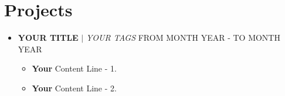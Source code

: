 \documentclass[letterpaper,5pt]{article}
\begin{document}
        
    
    \section{Projects}
    
        \begin{itemize}[leftmargin=0.15in,label={}]
          \item{
            \textbf{YOUR TITLE} $|$ \emph{YOUR TAGS}
          }
          \hfill FROM MONTH YEAR - TO MONTH YEAR
          \begin{itemize} 
            \vspace{-5pt}
            \item[\textbullet{}]\textbf{Your} Content Line - 1.
            \vspace{-5pt}
            \item[\textbullet{}]\textbf{Your} Content Line - 2.
          \end{itemize}
          \end{itemize}

        


    
      
    
    
    
    
      
\end{document}
